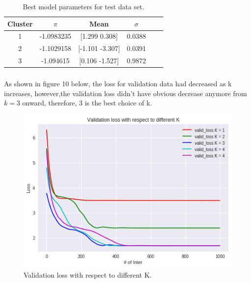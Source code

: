\documentclass[10pt,letterpaper]{article}
\begin{document}
\begin{table}[H]
\centering
{\small

\begin{tabular}{cccccc}
\hline
Cluster  & $\pi$      & Mean & $\sigma$\\ \hline
1 & -1.0983235  & [1.299 0.308] & 0.0388 \\ 
2 & -1.1029158   & [-1.101 -3.307] & 0.0391 \\ 
3 & -1.094615  & [0.106 -1.527] & 0.9872\\ \hline
\end{tabular}
}
\vspace{-0.2cm}
\caption{Best model parameters for test data set.}
\label{tab:Number of hidden units}
\vspace{-0.4cm}
\end{table}


\subsubsection{}
\qquad As shown in figure 10 below, the loss for validation data had decreased as k increases, however,the validation loss didn't have obvious decrease anymore from $k=3$ onward, therefore, 3 is the best choice of k.\\

\begin{figure}[H]
\centering
  \includegraphics[width=.42\linewidth]{imgs/p2_2_2_loss.png}
  \caption{Validation loss with respect to different K.}
\end{figure}
\end{document}
